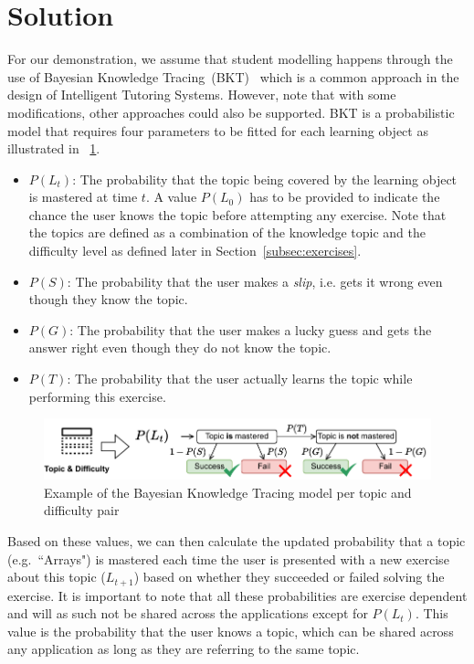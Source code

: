 \section{Solution}
For our demonstration, we assume that student modelling happens through the use of Bayesian Knowledge Tracing~(BKT)~\cite{bulut2023introduction} which is a common approach in the design of Intelligent Tutoring Systems. However, note that with some modifications, other approaches could also be supported. BKT is a probabilistic model that requires four parameters to be fitted for each learning object as illustrated in \figurename~\ref{fig:bkt}. 
\begin{itemize}
    \item \textbf{$P(L_t)$}: The probability that the topic being covered by the learning object is mastered at time $t$. A value $P(L_0)$ has to be provided to indicate the chance the user knows the topic before attempting any exercise. Note that the topics are defined as a combination of the knowledge topic and the difficulty level as defined later in Section~\ref{subsec:exercises}.
    \item \textbf{$P(S)$}: The probability that the user makes a \emph{slip}, i.e. gets it wrong even though they know the topic.
    \item \textbf{$P(G)$}: The probability that the user makes a lucky guess and gets the answer right even though they do not know the topic.
    \item \textbf{$P(T)$}: The probability that the user actually learns the topic while performing this exercise.
\end{itemize}

\begin{figure}[htb]
    \centering\includegraphics[scale=0.95]{images/BKT.pdf}
    \caption{Example of the Bayesian Knowledge Tracing model per topic and difficulty pair}\label{fig:bkt}
\end{figure}

Based on these values, we can then calculate the updated probability that a topic (e.g.~``Arrays") is mastered each time the user is presented with a new exercise about this topic ($L_{t+1}$) based on whether they succeeded or failed solving the exercise. It is important to note that all these probabilities are exercise dependent and will as such not be shared across the applications except for $P(L_t)$. This value is the probability that the user knows a topic, which can be shared across any application as long as they are referring to the same topic.  

